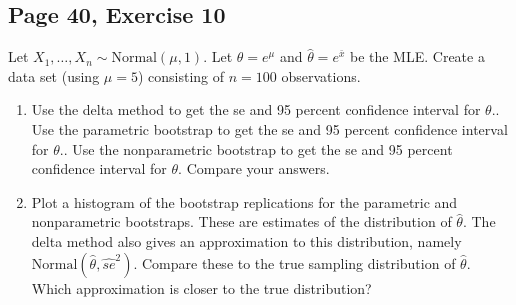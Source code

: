 \documentclass[11pt]{article}
\theoremstyle{definition}
\theoremstyle{remark}
\theoremstyle{remark}
\begin{document}
\subsection*{Page 40, Exercise 10}
Let $X_1, \ldots, X_n \sim \mathrm{Normal}(\mu,1)$. Let
$\theta = e^\mu$ and $\hat{\theta}=e^{\bar{x}}$ be the MLE. Create a
data set (using $\mu = 5$) consisting of $n = 100$ observations.
\begin{enumerate}[label=\alph*)]
\item Use the delta method to get the se and 95 percent confidence
  interval for $\theta.$. Use the parametric bootstrap to get the se
  and 95 percent confidence interval for $\theta.$. Use the
  nonparametric bootstrap to get the se and 95 percent confidence
  interval for $\theta.$ Compare your answers.
\item Plot a histogram of the bootstrap replications for the
  parametric and nonparametric bootstraps. These are estimates of the
  distribution of $\hat{\theta}$. The delta method also gives an
  approximation to this distribution, namely
  $\mathrm{Normal}(\hat{\theta}, \hat{se}^2)$. Compare these to the
  true sampling distribution of $\hat{\theta}$. Which approximation is
  closer to the true distribution?
\end{enumerate}
\end{document}
